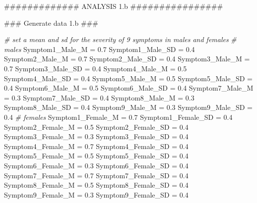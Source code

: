 \documentclass[]{article}
\newenvironment{Shaded}{\begin{snugshade}}{\end{snugshade}}
\newcommand{\FloatTok}[1]{\textcolor[rgb]{0.00,0.00,0.81}{#1}}
\newcommand{\StringTok}[1]{\textcolor[rgb]{0.31,0.60,0.02}{#1}}
\newcommand{\CommentTok}[1]{\textcolor[rgb]{0.56,0.35,0.01}{\textit{#1}}}
\newcommand{\AlertTok}[1]{\textcolor[rgb]{0.94,0.16,0.16}{#1}}
\newcommand{\NormalTok}[1]{#1}
\begin{document}
\begin{Shaded}
\begin{Highlighting}[]
\NormalTok{############# ANALYSIS 1.b ################}

\NormalTok{### Generate data 1.b }\AlertTok{###}

\CommentTok{# set a mean and sd for the severity of 9 symptoms in males and females}
\CommentTok{# males}
\NormalTok{Symptom1_Male_M =}\StringTok{ }\FloatTok{0.7}
\NormalTok{Symptom1_Male_SD =}\StringTok{ }\FloatTok{0.4}
\NormalTok{Symptom2_Male_M =}\StringTok{ }\FloatTok{0.7}
\NormalTok{Symptom2_Male_SD =}\StringTok{ }\FloatTok{0.4}
\NormalTok{Symptom3_Male_M =}\StringTok{ }\FloatTok{0.7}
\NormalTok{Symptom3_Male_SD =}\StringTok{ }\FloatTok{0.4}
\NormalTok{Symptom4_Male_M =}\StringTok{ }\FloatTok{0.5}
\NormalTok{Symptom4_Male_SD =}\StringTok{ }\FloatTok{0.4}
\NormalTok{Symptom5_Male_M =}\StringTok{ }\FloatTok{0.5}
\NormalTok{Symptom5_Male_SD =}\StringTok{ }\FloatTok{0.4}
\NormalTok{Symptom6_Male_M =}\StringTok{ }\FloatTok{0.5}
\NormalTok{Symptom6_Male_SD =}\StringTok{ }\FloatTok{0.4}
\NormalTok{Symptom7_Male_M =}\StringTok{ }\FloatTok{0.3}
\NormalTok{Symptom7_Male_SD =}\StringTok{ }\FloatTok{0.4}
\NormalTok{Symptom8_Male_M =}\StringTok{ }\FloatTok{0.3}
\NormalTok{Symptom8_Male_SD =}\StringTok{ }\FloatTok{0.4}
\NormalTok{Symptom9_Male_M =}\StringTok{ }\FloatTok{0.3}
\NormalTok{Symptom9_Male_SD =}\StringTok{ }\FloatTok{0.4}
\CommentTok{# females}
\NormalTok{Symptom1_Female_M =}\StringTok{ }\FloatTok{0.7}
\NormalTok{Symptom1_Female_SD =}\StringTok{ }\FloatTok{0.4}
\NormalTok{Symptom2_Female_M =}\StringTok{ }\FloatTok{0.5}
\NormalTok{Symptom2_Female_SD =}\StringTok{ }\FloatTok{0.4}
\NormalTok{Symptom3_Female_M =}\StringTok{ }\FloatTok{0.3}
\NormalTok{Symptom3_Female_SD =}\StringTok{ }\FloatTok{0.4}
\NormalTok{Symptom4_Female_M =}\StringTok{ }\FloatTok{0.7}
\NormalTok{Symptom4_Female_SD =}\StringTok{ }\FloatTok{0.4}
\NormalTok{Symptom5_Female_M =}\StringTok{ }\FloatTok{0.5}
\NormalTok{Symptom5_Female_SD =}\StringTok{ }\FloatTok{0.4}
\NormalTok{Symptom6_Female_M =}\StringTok{ }\FloatTok{0.3}
\NormalTok{Symptom6_Female_SD =}\StringTok{ }\FloatTok{0.4}
\NormalTok{Symptom7_Female_M =}\StringTok{ }\FloatTok{0.7}
\NormalTok{Symptom7_Female_SD =}\StringTok{ }\FloatTok{0.4}
\NormalTok{Symptom8_Female_M =}\StringTok{ }\FloatTok{0.5}
\NormalTok{Symptom8_Female_SD =}\StringTok{ }\FloatTok{0.4}
\NormalTok{Symptom9_Female_M =}\StringTok{ }\FloatTok{0.3}
\NormalTok{Symptom9_Female_SD =}\StringTok{ }\FloatTok{0.4}


\end{Highlighting}
\end{Shaded}
\end{document}
